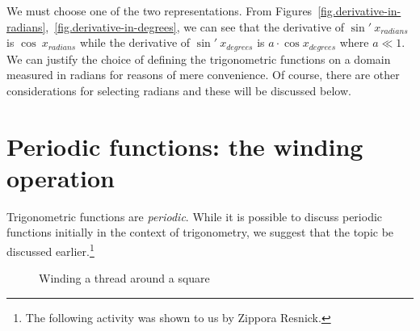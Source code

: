 We must choose one of the two representations.
From Figures~\ref{fig.derivative-in-radians},~\ref{fig.derivative-in-degrees}, we can see that the derivative of $\sin'\: x_{\scriptstyle radians}$ is $\cos\: x_{\scriptstyle radians}$ while the derivative of $\sin'\: x_{\scriptstyle degrees}$ is $a\cdot\cos x_{\scriptstyle degrees}$ where $a\ll 1$.
We can justify the choice of defining the trigonometric functions on a domain measured in radians for reasons of mere convenience.
Of course, there are other considerations for selecting radians and these will be discussed below.

\section{Periodic functions: the winding operation}

Trigonometric functions are \emph{periodic}.
While it is possible to discuss periodic functions initially in the context of trigonometry, we suggest that the topic be discussed earlier.\footnote{The following activity was shown to us by Zippora Resnick.}

\begin{wrapfigure}[11]{r}{.5\textwidth}
\begin{center}
\vspace{-6ex}
\caption{Winding a thread around a square}\label{fig.winding-around-a-square}
\end{center}
\end{wrapfigure}

